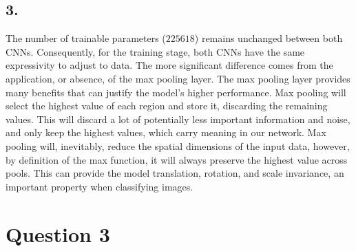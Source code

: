 \documentclass[11pt]{article}
\begin{document}
\subsection*{3.}

The number of trainable parameters ($225618$) remains unchanged between both CNNs. Consequently, for the training stage, both CNNs have the same expressivity to adjust to data. The more significant difference comes from the application, or absence, of the max pooling layer. The max pooling layer provides many benefits that can justify the model's higher performance. Max pooling will select the highest value of each region and store it, discarding the remaining values. This will discard a lot of potentially less important information and noise, and only keep the highest values, which carry meaning in our network. Max pooling will, inevitably, reduce the spatial dimensions of the input data, however, by definition of the max function, it will always preserve the highest value across pools. This can provide the model translation, rotation, and scale invariance, an important property when classifying images.

\section*{Question 3}
\end{document}
